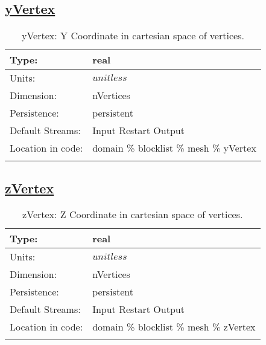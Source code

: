 \subsection[yVertex]{\hyperref[sec:var_tab_mesh]{yVertex}}
\label{subsec:var_sec_mesh_yVertex}
\begin{center}
\begin{longtable}{| p{2.0in} | p{4.0in} |}
        \hline 
        Type: & real \\
        \hline 
        Units: & $unitless$ \\
        \hline 
        Dimension: & nVertices \\
        \hline 
        Persistence: & persistent \\
        \hline 
		 Default Streams: & Input Restart Output  \\
        \hline 
		 Location in code: & domain \% blocklist \% mesh \% yVertex \\
		 \hline 
    \caption{yVertex: Y Coordinate in cartesian space of vertices.}
\end{longtable}
\end{center}
\subsection[zVertex]{\hyperref[sec:var_tab_mesh]{zVertex}}
\label{subsec:var_sec_mesh_zVertex}
\begin{center}
\begin{longtable}{| p{2.0in} | p{4.0in} |}
        \hline 
        Type: & real \\
        \hline 
        Units: & $unitless$ \\
        \hline 
        Dimension: & nVertices \\
        \hline 
        Persistence: & persistent \\
        \hline 
		 Default Streams: & Input Restart Output  \\
        \hline 
		 Location in code: & domain \% blocklist \% mesh \% zVertex \\
		 \hline 
    \caption{zVertex: Z Coordinate in cartesian space of vertices.}
\end{longtable}
\end{center}
